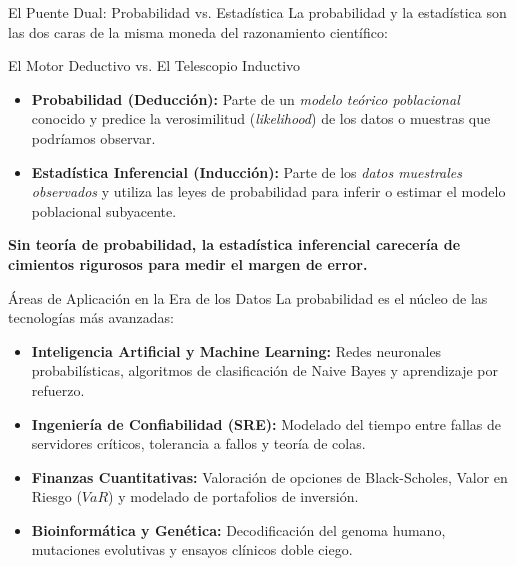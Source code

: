 \begin{frame}{El Puente Dual: Probabilidad vs. Estadística}
  La probabilidad y la estadística son las dos caras de la misma moneda del razonamiento científico:
  
  \vspace{0.2em}
  \begin{block}{El Motor Deductivo vs. El Telescopio Inductivo}
    \begin{itemize}
      \item \textbf{Probabilidad (Deducción):} Parte de un \emph{modelo teórico poblacional} conocido y predice la verosimilitud (\emph{likelihood}) de los datos o muestras que podríamos observar. \pause
      \item \textbf{Estadística Inferencial (Inducción):} Parte de los \emph{datos muestrales observados} y utiliza las leyes de probabilidad para inferir o estimar el modelo poblacional subyacente.
    \end{itemize}
  \end{block}
  
  \vspace{0.2em}
  \pause
  \begin{center}
    \small \textbf{Sin teoría de probabilidad, la estadística inferencial carecería de cimientos rigurosos para medir el margen de error.}
  \end{center}
\end{frame}

\begin{frame}{Áreas de Aplicación en la Era de los Datos}
  La probabilidad es el núcleo de las tecnologías más avanzadas:
  \vspace{0.4em}
  \begin{itemize}
    \item \textbf{Inteligencia Artificial y Machine Learning:} Redes neuronales probabilísticas, algoritmos de clasificación de Naive Bayes y aprendizaje por refuerzo. \pause
    \item \textbf{Ingeniería de Confiabilidad (SRE):} Modelado del tiempo entre fallas de servidores críticos, tolerancia a fallos y teoría de colas. \pause
    \item \textbf{Finanzas Cuantitativas:} Valoración de opciones de Black-Scholes, Valor en Riesgo ($VaR$) y modelado de portafolios de inversión. \pause
    \item \textbf{Bioinformática y Genética:} Decodificación del genoma humano, mutaciones evolutivas y ensayos clínicos doble ciego.
  \end{itemize}
\end{frame}


